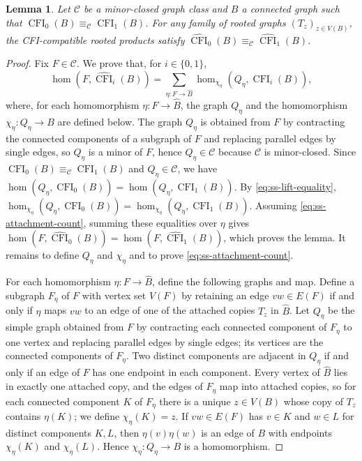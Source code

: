 \documentclass[11pt,a4paper]{article}
\theoremstyle{plain}
\newtheorem{lemma}[theorem]{Lemma}
\theoremstyle{definition}
\DeclareMathOperator{\CFI}{CFI}
\begin{document}
\begin{lemma}\label{lem:ss-attachments}
Let $\mathcal C$ be a minor-closed graph class and $B$ a connected graph
such that $\CFI_0(B)\equiv_{\mathcal C}\CFI_1(B)$.
For any family of rooted graphs $(T_z)_{z\in V(B)}$, the CFI-compatible
rooted products satisfy
$\widehat{\CFI}_0(B)\equiv_{\mathcal C}\widehat{\CFI}_1(B)$.
\end{lemma}
\begin{proof}
Fix $F\in\mathcal C$.
We prove that, for $i\in\{0,1\}$,
\begin{equation}\label{eq:ss-attachment-count}
 \hom(F,\widehat{\CFI}_i(B))=
 \sum_{\eta:F\to\widehat B}\hom_{\chi_\eta}(Q_\eta,\CFI_i(B)),
\end{equation}
where, for each homomorphism $\eta:F\to\widehat B$, the graph $Q_\eta$
and the homomorphism $\chi_\eta:Q_\eta\to B$ are defined below.
The graph $Q_\eta$ is obtained from $F$ by contracting the connected
components of a subgraph of $F$ and replacing parallel edges by single edges, so
$Q_\eta$ is a minor of $F$, hence $Q_\eta\in\mathcal C$ because
$\mathcal C$ is minor-closed.
Since $\CFI_0(B)\equiv_{\mathcal C}\CFI_1(B)$ and $Q_\eta\in\mathcal C$,
we have $\hom(Q_\eta,\CFI_0(B))=\hom(Q_\eta,\CFI_1(B))$.
By \cref{eq:ss-lift-equality},
$\hom_{\chi_\eta}(Q_\eta,\CFI_0(B))=\hom_{\chi_\eta}(Q_\eta,\CFI_1(B))$.
Assuming \cref{eq:ss-attachment-count}, summing these equalities over $\eta$
gives $\hom(F,\widehat{\CFI}_0(B))=\hom(F,\widehat{\CFI}_1(B))$, which
proves the lemma.
It remains to define $Q_\eta$ and $\chi_\eta$ and to prove
\cref{eq:ss-attachment-count}.

For each homomorphism $\eta:F\to\widehat B$, define the following graphs and map.
Define a subgraph $F_\eta$ of $F$
with vertex set $V(F)$ by retaining an edge $vw\in E(F)$ if and only if
$\eta$ maps $vw$ to an edge of one of the attached copies $T_z$ in $\widehat B$.
Let $Q_\eta$ be the simple graph obtained from $F$ by contracting each
connected component of $F_\eta$ to one vertex and replacing parallel
edges by single edges; its vertices are the connected components of $F_\eta$.
Two distinct components are adjacent in $Q_\eta$ if and only if an edge of
$F$ has one endpoint in each component.
Every vertex of $\widehat B$ lies in exactly one attached copy, and the
edges of $F_\eta$ map into attached copies, so for each connected
component $K$ of $F_\eta$ there is a unique $z\in V(B)$ whose copy of
$T_z$ contains $\eta(K)$; we define $\chi_\eta(K)=z$.
If $vw\in E(F)$ has $v\in K$ and $w\in L$ for distinct components $K,L$, then
$\eta(v)\eta(w)$ is an edge of $B$ with endpoints $\chi_\eta(K)$ and
$\chi_\eta(L)$.
Hence $\chi_\eta:Q_\eta\to B$ is a homomorphism.


\end{proof}
\end{document}
